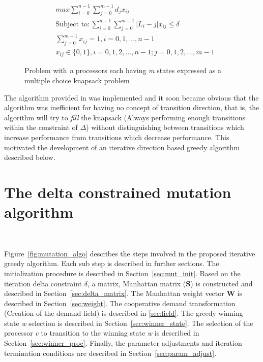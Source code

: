 \begin{figure}[h!]
\centering
\begin{align*}
    & max \displaystyle\sum_{i=0}^{n-1} \displaystyle\sum_{j=0}^{m-1} d_jx_{ij} \\
    & \text{Subject to} : \displaystyle\sum_{i=0}^{n-1} \displaystyle\sum_{j=0}^{m-1} |L_i - j| x_{ij} \leq \delta \\
    & \displaystyle\sum_{j=0}^{m-1} x_{ij} = 1 , i = 0, 1, ..., n-1 \\
    & x_{ij} \in \{0,1\} , i = 0,1,2,...,n-1 ; j = 0,1,2,...,m-1  
\end{align*}
\caption{Problem with \textit{n} processors each having \textit{m} states expressed as a multiple choice knapsack problem}
\label{fig:mckp}
\end{figure}

The algorithm provided in \cite{mckp} was implemented and it soon became obvious 
that the algorithm was inefficient for having no concept of transition direction,
that is, the algorithm will try to \textit{fill} the knapsack (Always performing
enough transitions within the constraint of $\Delta$) without distinguishing between
transitions which increase performance from transitions which decrease performance.
This motivated the development of an iterative direction based greedy algorithm described below.

\section{The delta constrained mutation algorithm}~\label{sec:delta_algo}

Figure~\ref{fig:mutation_algo} describes the steps involved in the proposed iterative greedy algorithm. 
Each sub step is described in further sections. The initialization procedure is described in Section~\ref{sec:mut_init}.
Based on the iteration delta constraint $\delta$, a matrix, Manhattan
matrix (\textbf{S}) is constructed and described in Section~\ref{sec:delta_matrix}.
The Manhattan weight vector \textbf{W} is described in Section~\ref{sec:weight}.
The cooperative demand transformation (Creation of the demand field) is described in
\ref{sec:field}. The greedy winning state \textit{w} selection is described in Section~\ref{sec:winner_state}.
The selection of the processor \textit{c} to transition to the winning state \textit{w} 
is described in Section~\ref{sec:winner_proc}. Finally, the parameter adjustments and iteration
termination conditions are described in Section~\ref{sec:param_adjust}. 

